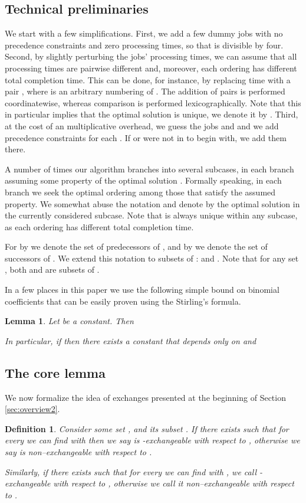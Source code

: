 \documentclass{article}
\newtheorem{lemma}[theorem]{Lemma}
\newtheorem{definition}[theorem]{Definition}
\theoremstyle{definition}
\begin{document}
\subsection{Technical preliminaries}\label{sec:init}
We start with a few simplifications.
First, we add a few dummy jobs with no precedence constraints and zero processing times, so that  is divisible by four.
Second, by slightly perturbing the jobs' processing times, we can assume
that all processing times are pairwise different and, moreover, each ordering has different total completion time.
This can be done, for instance, by replacing time  with a pair ,
where  is an arbitrary numbering of . The addition of pairs is performed coordinatewise,
whereas comparison is performed lexicographically.
Note that this in particular implies that the optimal solution is unique, we denote it by .
Third, at the cost of an  multiplicative overhead,
we guess the jobs  and 
and we add precedence constraints  for each .
If  or  were not in  to begin with, we add them there.

A number of times our algorithm branches into several subcases, in each branch assuming some property
of the optimal solution . Formally speaking, in each branch we seek the optimal ordering
among those that satisfy the assumed property. We somewhat abuse the notation and denote by 
the optimal solution in the currently considered subcase.
Note that  is always unique within any subcase, as each ordering
has different total completion time.

For  by  we denote the set 
of predecessors of ,
and by  we denote the set  of successors of .
We extend this notation to subsets of : 
and .
Note that for any set , both  and  are subsets of .

In a few places in this paper we use the following simple bound on binomial coefficients
that can be easily proven using the Stirling's formula.
\begin{lemma}\label{lem:binom}
Let  be a constant. Then

In particular, if  then there exists a constant 
that depends only on  and

\end{lemma}

\subsection{The core lemma}\label{sec:core}

We now formalize the idea of exchanges presented at the beginning of Section \ref{sec:overview2}.
\begin{definition}\label{def:xch}
Consider some set , and its subset .
If there exists  such that for every  we can
find  with  then
we say  is {\em -exchangeable} with respect to , otherwise
we say  is {\em non--exchangeable} with respect to .

Similarly, if there exists  such that for every 
we can find  with ,
we call  {\em -exchangeable} with respect to , otherwise we call
it {\em non--exchangeable} with respect to .
\end{definition}
\end{document}
